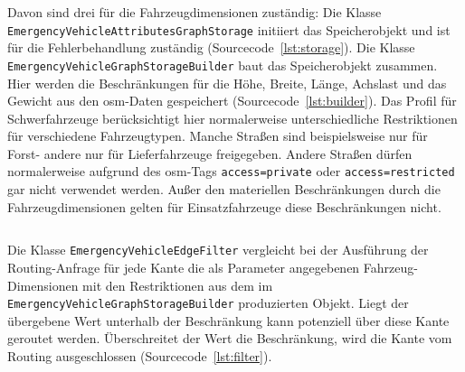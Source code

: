 Davon sind drei für die Fahrzeugdimensionen zuständig:
\newline
Die Klasse \texttt{EmergencyVehicleAttributesGraphStorage} initiiert das Speicherobjekt und ist für die Fehlerbehandlung zuständig (Sourcecode~\ref{lst:storage}).
\newline
Die Klasse \texttt{EmergencyVehicleGraphStorageBuilder} baut das Speicherobjekt zusammen.
Hier werden die Beschränkungen für die Höhe, Breite, Länge, Achslast und das Gewicht aus den \gls{osm}-Daten gespeichert (Sourcecode~\ref{lst:builder}).
Das Profil für Schwerfahrzeuge berücksichtigt hier normalerweise unterschiedliche Restriktionen für verschiedene Fahrzeugtypen.
Manche Straßen sind beispielsweise nur für Forst- andere nur für Lieferfahrzeuge freigegeben.
Andere Straßen dürfen normalerweise aufgrund des \gls{osm}-Tags \texttt{access=private} oder \texttt{access=restricted} gar nicht verwendet werden.
Außer den materiellen Beschränkungen durch die Fahrzeugdimensionen gelten für Einsatzfahrzeuge diese Beschränkungen nicht.

\begin{listing}[htb]
\centering
{}
\inputminted[gobble=6, fontsize=\footnotesize, breaklines=true, breakbytoken=|, firstline=161, lastline=180]{java}{../data/JavaFiles/EmergencyVehicleGraphStorageBuilder.java}
\caption{Entnahme der Dimensionsbeschränkungen}
\label{lst:builder}
\end{listing}

Die Klasse \texttt{EmergencyVehicleEdgeFilter} vergleicht bei der Ausführung der Routing-Anfrage für jede Kante die als Parameter angegebenen Fahrzeug-Dimensionen mit den Restriktionen aus dem im \texttt{EmergencyVehicleGraphStorageBuilder} produzierten Objekt.
Liegt der übergebene Wert unterhalb der Beschränkung kann potenziell über diese Kante geroutet werden.
Überschreitet der Wert die Beschränkung, wird die Kante vom Routing ausgeschlossen (Sourcecode~\ref{lst:filter}).


